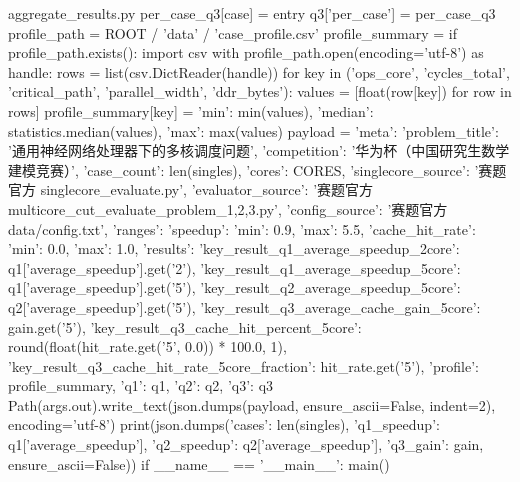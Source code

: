\begin{Python}{aggregate\_results.py}
        per_case_q3[case] = entry
    q3['per_case'] = per_case_q3
    profile_path = ROOT / 'data' / 'case_profile.csv'
    profile_summary = {}
    if profile_path.exists():
        import csv
        with profile_path.open(encoding='utf-8') as handle:
            rows = list(csv.DictReader(handle))
        for key in ('ops_core', 'cycles_total', 'critical_path', 'parallel_width', 'ddr_bytes'):
            values = [float(row[key]) for row in rows]
            profile_summary[key] = {'min': min(values), 'median': statistics.median(values), 'max': max(values)}
    payload = {'meta': {'problem_title': '通用神经网络处理器下的多核调度问题', 'competition': '华为杯（中国研究生数学建模竞赛）', 'case_count': len(singles), 'cores': CORES, 'singlecore_source': '赛题官方 singlecore_evaluate.py', 'evaluator_source': '赛题官方 multicore_cut_evaluate_problem_{1,2,3}.py', 'config_source': '赛题官方 data/config.txt'}, 'ranges': {'speedup': {'min': 0.9, 'max': 5.5}, 'cache_hit_rate': {'min': 0.0, 'max': 1.0}}, 'results': {'key_result_q1_average_speedup_2core': q1['average_speedup'].get('2'), 'key_result_q1_average_speedup_5core': q1['average_speedup'].get('5'), 'key_result_q2_average_speedup_5core': q2['average_speedup'].get('5'), 'key_result_q3_average_cache_gain_5core': gain.get('5'), 'key_result_q3_cache_hit_percent_5core': round(float(hit_rate.get('5', 0.0)) * 100.0, 1), 'key_result_q3_cache_hit_rate_5core_fraction': hit_rate.get('5')}, 'profile': profile_summary, 'q1': q1, 'q2': q2, 'q3': q3}
    Path(args.out).write_text(json.dumps(payload, ensure_ascii=False, indent=2), encoding='utf-8')
    print(json.dumps({'cases': len(singles), 'q1_speedup': q1['average_speedup'], 'q2_speedup': q2['average_speedup'], 'q3_gain': gain}, ensure_ascii=False))
if __name__ == '__main__':
    main()
\end{Python}
